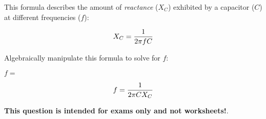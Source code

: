

This formula describes the amount of {\it reactance} ($X_C$) exhibited by a capacitor ($C$) at different frequencies ($f$):

$$X_C = {1 \over {2 \pi f C}}$$

Algebraically manipulate this formula to solve for $f$:

\vskip 20pt

$f = $







$$f = {1 \over {2 \pi C X_C}}$$







{\bf This question is intended for exams only and not worksheets!}.



